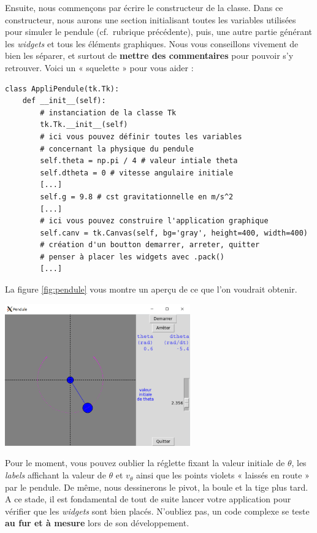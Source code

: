\documentclass[a4paper,11pt,twoside]{book}
\let\origfigure=\figure
\let\endorigfigure=\endfigure
\renewenvironment{figure}[1][]{%
   \origfigure[!htbp]
}{%
   \endorigfigure
}
\begin{document}
Ensuite, nous commençons par écrire le constructeur de la classe. Dans
ce constructeur, nous aurons une section initialisant toutes les
variables utilisées pour simuler le pendule (cf.~rubrique précédente),
puis, une autre partie générant les \emph{widgets} et tous les éléments
graphiques. Nous vous conseillons vivement de bien les séparer, et
surtout de \textbf{mettre des commentaires} pour pouvoir s'y retrouver.
Voici un « squelette » pour vous aider :

\begin{verbatim}
class AppliPendule(tk.Tk):
    def __init__(self):
        # instanciation de la classe Tk
        tk.Tk.__init__(self)
        # ici vous pouvez définir toutes les variables
        # concernant la physique du pendule
        self.theta = np.pi / 4 # valeur intiale theta
        self.dtheta = 0 # vitesse angulaire initiale
        [...]
        self.g = 9.8 # cst gravitationnelle en m/s^2
        [...]
        # ici vous pouvez construire l'application graphique
        self.canv = tk.Canvas(self, bg='gray', height=400, width=400)
        # création d'un boutton demarrer, arreter, quitter
        # penser à placer les widgets avec .pack()
        [...]
\end{verbatim}

La figure \ref{fig:pendule} vous montre un aperçu de ce que l'on
voudrait obtenir.

\begin{figure}[htbp]
\centering
\includegraphics[width=0.60000\textwidth]{img/pendule.png}
\caption{Application pendule.\label{fig:pendule}}
\end{figure}

Pour le moment, vous pouvez oublier la réglette fixant la valeur
initiale de \(\theta\), les \emph{labels} affichant la valeur de
\(\theta\) et \(v_{\theta}\) ainsi que les points violets « laissés en
route » par le pendule. De même, nous dessinerons le pivot, la boule et
la tige plus tard. A ce stade, il est fondamental de tout de suite
lancer votre application pour vérifier que les \emph{widgets} sont bien
placés. N'oubliez pas, un code complexe se teste \textbf{au fur et à
mesure} lors de son développement.
\end{document}
